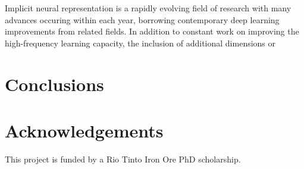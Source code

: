 \documentclass[manuscript.tex]{subfiles}
\begin{document}
Implicit neural representation is a rapidly evolving field of research with many advances occuring within each year, borrowing contemporary deep learning improvements from related fields.
In addition to constant work on improving the high-frequency learning capacity, the inclusion of additional dimensions or

\section{Conclusions}

\section{Acknowledgements}
This project is funded by a Rio Tinto Iron Ore PhD scholarship.

\printbibliography{}
\end{document}
